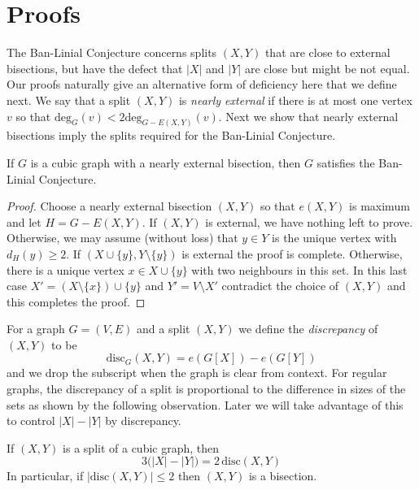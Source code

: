\documentclass[12pt]{article}
\begin{document}
\section{Proofs}

The Ban-Linial Conjecture concerns splits $(X,Y)$ that are close to external bisections, but have the defect that $|X|$ and $|Y|$ are close but might be not equal.  Our proofs naturally give an alternative form of deficiency here that we define next.  We say that a split $(X,Y)$ is \emph{nearly external} if there is at most one vertex $v$ so that $\mathrm{deg}_G(v) <  2 \mathrm{deg}_{G- E(X,Y)} (v)$.  Next we show that nearly external bisections imply the splits required for the Ban-Linial Conjecture.


\begin{lemma}
\label{nearlyexternal2banlinial}
If $G$ is a cubic graph with a nearly external bisection, then $G$ satisfies the Ban-Linial Conjecture.
\end{lemma}

\begin{proof}
Choose a nearly external bisection $(X,Y)$ so that $e(X,Y)$ is maximum and let $H = G - E(X,Y)$.  If $(X,Y)$ is external, we have nothing left to prove.  Otherwise, we may assume (without loss) that $y \in Y$ is the unique vertex with $d_H(y) \ge 2$.  If $(X \cup \{y\}, Y \setminus \{y\})$ is external the proof is complete.  Otherwise, there is a unique vertex $x \in X \cup \{y\}$ with two neighbours in this set. In this last case $X' = (X \setminus \{x\}) \cup \{y\}$ and $Y' = V \setminus X'$ contradict the choice of $(X,Y)$ and this completes the proof. 
\end{proof}



For a graph $G = (V,E)$ and a split $(X,Y)$ we define the \emph{discrepancy} of $(X,Y)$ to be
\[ \mathrm{disc}_G(X,Y) = e ( G[X] ) - e(G[Y]) \]
and we drop the subscript when the graph is clear from context.  For regular graphs, the discrepancy of a split is proportional to the difference in sizes of the sets as shown by the following observation.  Later we will take advantage of this to control $|X| - |Y|$ by discrepancy.

\begin{observation}
\label{disc2bisect}
If $(X,Y)$ is a split of a cubic graph, then 
\[ 3\big( |X| - |Y| \big) = 2 \, \mathrm{disc}(X,Y) \]
In particular, if $|\mathrm{disc}(X,Y)| \le 2$ then $(X,Y)$ is a bisection.
\end{observation}
\end{document}
